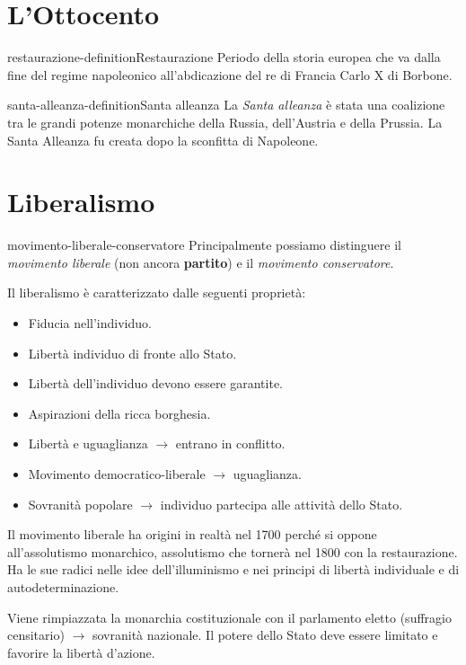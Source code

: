 \documentclass[preview]{standalone}
\begin{document}
\genpage

\section{L'Ottocento}

\begin{snippetdefinition}{restaurazione-definition}{Restaurazione}
    Periodo della storia europea che va dalla fine del regime napoleonico
    all'abdicazione del re di Francia Carlo X di Borbone.
\end{snippetdefinition}

\begin{snippetdefinition}{santa-alleanza-definition}{Santa alleanza}
    La \textit{Santa alleanza} è stata una coalizione tra le grandi potenze monarchiche della Russia, dell'Austria e della Prussia.
    La Santa Alleanza fu creata dopo la sconfitta di Napoleone.
\end{snippetdefinition}

\section{Liberalismo}

\begin{snippet}{movimento-liberale-conservatore}
    Principalmente possiamo distinguere il \textit{movimento liberale} (non ancora \textbf{partito})
    e il \textit{movimento conservatore}.

    Il liberalismo è caratterizzato dalle seguenti proprietà:
    \begin{itemize}
        \item Fiducia nell'individuo.
        \item Libertà individuo di fronte allo Stato.
        \item Libertà dell'individuo devono essere garantite.
        \item Aspirazioni della ricca borghesia.
        \item Libertà e uguaglianza \(\rightarrow\) entrano in conflitto.
        \item Movimento democratico-liberale \(\rightarrow\) uguaglianza.
        \item Sovranità popolare \(\rightarrow\) individuo partecipa alle attività dello Stato.
    \end{itemize}

    Il movimento liberale ha origini in realtà nel 1700 perché si oppone
    all'assolutismo monarchico, assolutismo che tornerà nel 1800 con la restaurazione.
    Ha le sue radici nelle idee dell'illuminismo e nei principi di libertà individuale e di autodeterminazione.

    Viene rimpiazzata la monarchia costituzionale con il parlamento eletto (suffragio censitario)
    \(\rightarrow\) sovranità nazionale.
    Il potere dello Stato deve essere limitato e favorire la libertà d'azione.
\end{snippet}
\end{document}
